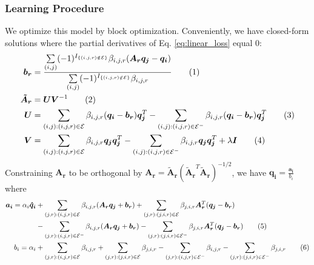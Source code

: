 \documentclass[11pt, a4paper]{article}
\newcommand\numberthis{\addtocounter{equation}{1}\tag{\theequation}}
\begin{document}
\subsubsection*{Learning Procedure}
We optimize this model by block optimization. Conveniently, we have closed-form solutions where the partial derivatives of Eq. \ref{eq:linear_loss} equal $0$:
\begin{align*}
\boldsymbol{b_r} &= \frac{\sum\limits_{(i,j)}(-1)^{I_{\{(i,j,r)\notin\mathcal{E}\}}}\beta_{i,j,r}(\boldsymbol{A_rq_j}-\boldsymbol{q_i})} {\sum\limits_{(i,j)}(-1)^{I_{\{(i,j,r)\notin\mathcal{E}\}}}\beta_{i,j,r}} \numberthis{} \\
\boldsymbol{\tilde{A}_r} &= \boldsymbol{U}\boldsymbol{V}^{-1} \numberthis{}\\
\boldsymbol{U} &= \sum_{(i,j):(i,j,r)\in \mathcal{E}}\beta_{i,j,r}(\boldsymbol{q_i} - \boldsymbol{b_r})\boldsymbol{q_j}^T - \sum_{(i,j):(i,j,r)\in \mathcal{E}^-}\beta_{i,j,r}(\boldsymbol{q_i} - \boldsymbol{b_r})\boldsymbol{q_j}^T \numberthis{}\\
\boldsymbol{V} &= \sum_{(i,j): (i,j,r)\in \mathcal{E}}\beta_{i,j,r}\boldsymbol{q_j}\boldsymbol{q_j}^T - \sum_{(i,j): (i,j,r)\in \mathcal{E}^-}\beta_{i,j,r}\boldsymbol{q_j}\boldsymbol{q_j}^T + \lambda \boldsymbol{I} \numberthis{}
\end{align*}
Constraining $\boldsymbol{A_r}$ to be orthogonal by $\boldsymbol{A_r} = \boldsymbol{\tilde{A}_r}(\boldsymbol{\tilde{A}_r}^T\boldsymbol{\tilde{A}_r})^{-1/2}$, we have $\boldsymbol{q_i} = \frac{\boldsymbol{a_i}}{b_i}$ where %
\begin{align*}
\boldsymbol{a_i} = \alpha_i\boldsymbol{\hat{q}_i} &+ \sum\limits_{(j,r):(i,j,r)\in \mathcal{E}}\beta_{i,j,r}(\boldsymbol{A_r}\boldsymbol{q_j}+\boldsymbol{b_r}) + \sum\limits_{(j,r):(j,i,r)\in \mathcal{E}}\beta_{j,i,r}\boldsymbol{A_r}^T(\boldsymbol{q_j} - \boldsymbol{b_r}) \\
 &- \sum\limits_{(j,r):(i,j,r)\in \mathcal{E}^-}\beta_{i,j,r}(\boldsymbol{A_r}\boldsymbol{q_j}+\boldsymbol{b_r}) - \sum\limits_{(j,r):(j,i,r)\in \mathcal{E}^-}\beta_{j,i,r}\boldsymbol{A_r}^T(\boldsymbol{q_j} - \boldsymbol{b_r}) \numberthis{}\\
 b_i = \alpha_i &+ \sum\limits_{(j,r):(i,j,r)\in \mathcal{E}}\beta_{i,j,r} + \sum\limits_{(j,r):(j,i,r)\in \mathcal{E}}\beta_{j,i,r} - \sum\limits_{(j,r):(i,j,r)\in \mathcal{E}^-}\beta_{i,j,r} - \sum\limits_{(j,r):(j,i,r)\in \mathcal{E}^-}\beta_{j,i,r} \numberthis{}%
\label{eq:linear_orthogonal}
\end{align*}
\end{document}

